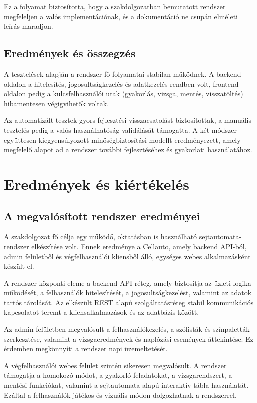 \documentclass{thesis-ekf}
\begin{document}
Ez a folyamat biztosította, hogy a szakdolgozatban bemutatott rendszer megfeleljen a valós implementációnak, és a dokumentáció ne csupán elméleti leírás maradjon.

\section{Eredmények és összegzés}
A tesztelések alapján a rendszer fő folyamatai stabilan működnek. A backend oldalon a hitelesítés, jogosultságkezelés és adatkezelés rendben volt, frontend oldalon pedig a kulcsfelhasználói utak (gyakorlás, vizsga, mentés, visszatöltés) hibamentesen végigvihetők voltak.

Az automatizált tesztek gyors fejlesztési visszacsatolást biztosítottak, a manuális tesztelés pedig a valós használhatóság validálását támogatta. A két módszer együttesen kiegyensúlyozott minőségbiztosítási modellt eredményezett, amely megfelelő alapot ad a rendszer további fejlesztéséhez és gyakorlati használatához.

\chapter{Eredmények és kiértékelés}

\section{A megvalósított rendszer eredményei}
A szakdolgozat fő célja egy működő, oktatásban is használható sejtautomata-rendszer elkészítése volt. Ennek eredménye a Cellauto, amely backend API-ból, admin felületből és végfelhasználói kliensből álló, egységes webes alkalmazásként készült el.

A rendszer központi eleme a backend API-réteg, amely biztosítja az üzleti logika működését, a felhasználók hitelesítését, a jogosultságkezelést, valamint az adatok tartós tárolását. Az elkészült REST alapú szolgáltatásréteg stabil kommunikációs kapcsolatot teremt a kliensalkalmazások és az adatbázis között.

Az admin felületben megvalósult a felhasználókezelés, a szólisták és színpaletták szerkesztése, valamint a vizsgaeredmények és naplózási események áttekintése. Ez érdemben megkönnyíti a rendszer napi üzemeltetését.

A végfelhasználói webes felület szintén sikeresen megvalósult. A rendszer támogatja a homokozó módot, a gyakorló feladatokat, a vizsgarendszert, a mentési funkciókat, valamint a sejtautomata-alapú interaktív tábla használatát. Ezáltal a felhasználók játékos és vizuális módon dolgozhatnak a rendszerrel.
\end{document}
